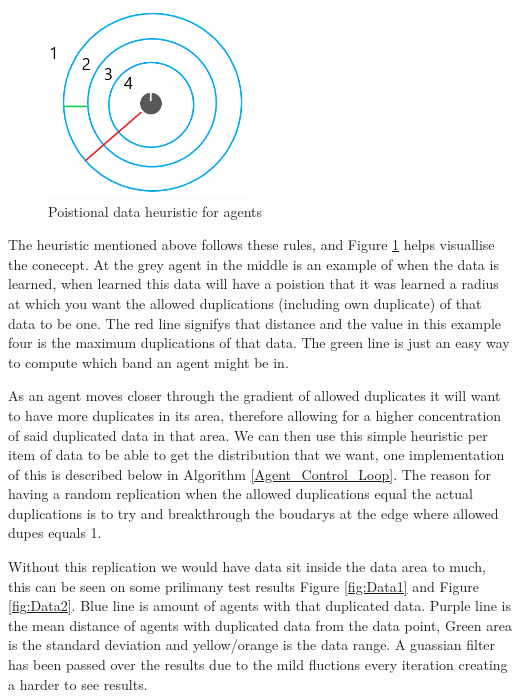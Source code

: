 \documentclass{UoYCSproject}
\begin{document}
\begin{figure}[htb]
\label{fig:Heuristic}
\begin{center}
\centering
\includegraphics[height=5cm]{"./ExplanationImgs/Heuristic.png"}
\caption{Poistional data heuristic for agents}
\end{center}
\end{figure}

The heuristic mentioned above follows these rules, and Figure \ref{fig:Heuristic} helps visuallise the conecept. 
At the grey agent in the middle is an example of when the data is learned, when learned this data will have a poistion that it was learned a radius at which you want the allowed duplications (including own duplicate) of that data to be one.
The red line signifys that distance and the value in this example four is the maximum duplications of that data.
The green line is just an easy way to compute which band an agent might be in.

As an agent moves closer through the gradient of allowed duplicates it will want to have more duplicates in its area, therefore allowing for a higher concentration of said duplicated data in that area.
We can then use this simple heuristic per item of data to be able to get the distribution that we want, one implementation of this is described below in Algorithm \ref{Agent_Control_Loop}.
The reason for having a random replication when the allowed duplications equal the actual duplications is to try and breakthrough the boudarys at the edge where allowed dupes equals 1.

Without this replication we would have data sit inside the data area to much, this can be seen on some prilimany test results Figure \ref{fig:Data1} and Figure \ref{fig:Data2}.
Blue line is amount of agents with that duplicated data.
Purple line is the mean distance of agents with duplicated data from the data point, Green area is the standard deviation and yellow/orange is the data range.
A guassian filter has been passed over the results due to the mild fluctions every iteration creating a harder to see results.
\end{document}
